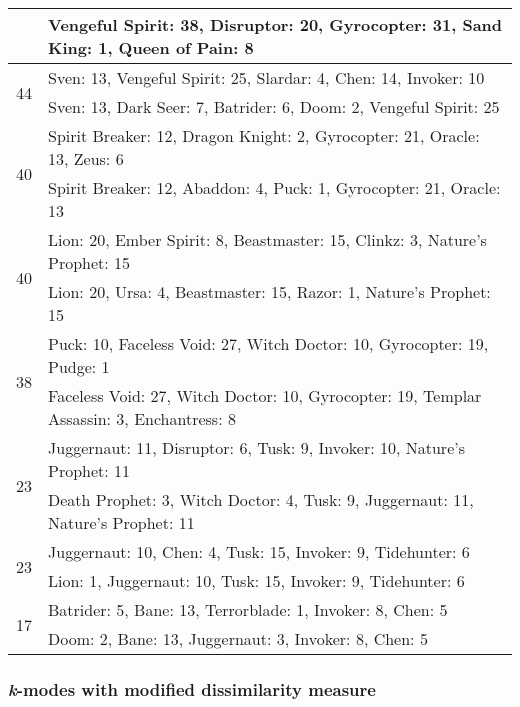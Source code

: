 \documentclass[result.tex]{subfiles}
\begin{document}
\begin{table}[H]
\begin{tabular}{ | c | p{12.5cm} | }
    & Vengeful Spirit: 38, Disruptor: 20, Gyrocopter: 31, Sand King: 1, Queen of Pain: 8 \\
    \hline
    \multirow{2}{*}{44}
    & Sven: 13, Vengeful Spirit: 25, Slardar: 4, Chen: 14, Invoker: 10 \\
    & Sven: 13, Dark Seer: 7, Batrider: 6, Doom: 2, Vengeful Spirit: 25 \\
    \hline
    \multirow{2}{*}{40}
    & Spirit Breaker: 12, Dragon Knight: 2, Gyrocopter: 21, Oracle: 13, Zeus: 6 \\
    & Spirit Breaker: 12, Abaddon: 4, Puck: 1, Gyrocopter: 21, Oracle: 13 \\
    \hline
    \multirow{2}{*}{40}
    & Lion: 20, Ember Spirit: 8, Beastmaster: 15, Clinkz: 3, Nature's Prophet: 15 \\
    & Lion: 20, Ursa: 4, Beastmaster: 15, Razor: 1, Nature's Prophet: 15 \\
    \hline
    \multirow{2}{*}{38}
    & Puck: 10, Faceless Void: 27, Witch Doctor: 10, Gyrocopter: 19, Pudge: 1 \\
    & Faceless Void: 27, Witch Doctor: 10, Gyrocopter: 19, Templar Assassin: 3, Enchantress: 8 \\
    \hline
    \multirow{2}{*}{23}
    & Juggernaut: 11, Disruptor: 6, Tusk: 9, Invoker: 10, Nature's Prophet: 11 \\
    & Death Prophet: 3, Witch Doctor: 4, Tusk: 9, Juggernaut: 11, Nature's Prophet: 11 \\
    \hline
    \multirow{2}{*}{23}
    & Juggernaut: 10, Chen: 4, Tusk: 15, Invoker: 9, Tidehunter: 6 \\
    & Lion: 1, Juggernaut: 10, Tusk: 15, Invoker: 9, Tidehunter: 6 \\
    \hline
    \multirow{2}{*}{17}
    & Batrider: 5, Bane: 13, Terrorblade: 1, Invoker: 8, Chen: 5 \\
    & Doom: 2, Bane: 13, Juggernaut: 3, Invoker: 8, Chen: 5 \\
    \hline
  \end{tabular}
  \caption{}
  \label{}
\end{table}

\newpage

\subsubsection*{\textit{k}-modes with modified dissimilarity measure}
\end{document}
